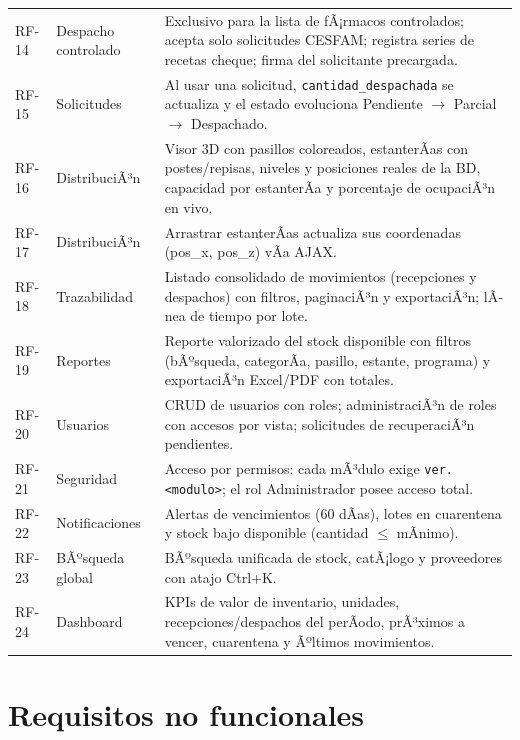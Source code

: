﻿\documentclass[a4paper, 12pt]{article}
\begin{document}
\begin{longtable}{@{}p{1.2cm} p{4.2cm} X@{}}
RF-14 & Despacho controlado & Exclusivo para la lista de fÃ¡rmacos controlados; acepta solo solicitudes CESFAM; registra series de recetas cheque; firma del solicitante precargada. \\
RF-15 & Solicitudes & Al usar una solicitud, \texttt{cantidad\_despachada} se actualiza y el estado evoluciona Pendiente $\to$ Parcial $\to$ Despachado. \\
RF-16 & DistribuciÃ³n & Visor 3D con pasillos coloreados, estanterÃ­as con postes/repisas, niveles y posiciones reales de la BD, capacidad por estanterÃ­a y porcentaje de ocupaciÃ³n en vivo. \\
RF-17 & DistribuciÃ³n & Arrastrar estanterÃ­as actualiza sus coordenadas (pos\_x, pos\_z) vÃ­a AJAX. \\
RF-18 & Trazabilidad & Listado consolidado de movimientos (recepciones y despachos) con filtros, paginaciÃ³n y exportaciÃ³n; lÃ­nea de tiempo por lote. \\
RF-19 & Reportes & Reporte valorizado del stock disponible con filtros (bÃºsqueda, categorÃ­a, pasillo, estante, programa) y exportaciÃ³n Excel/PDF con totales. \\
RF-20 & Usuarios & CRUD de usuarios con roles; administraciÃ³n de roles con accesos por vista; solicitudes de recuperaciÃ³n pendientes. \\
RF-21 & Seguridad & Acceso por permisos: cada mÃ³dulo exige \texttt{ver.<modulo>}; el rol Administrador posee acceso total. \\
RF-22 & Notificaciones & Alertas de vencimientos (60 dÃ­as), lotes en cuarentena y stock bajo disponible (cantidad $\le$ mÃ­nimo). \\
RF-23 & BÃºsqueda global & BÃºsqueda unificada de stock, catÃ¡logo y proveedores con atajo Ctrl+K. \\
RF-24 & Dashboard & KPIs de valor de inventario, unidades, recepciones/despachos del perÃ­odo, prÃ³ximos a vencer, cuarentena y Ãºltimos movimientos. \\
\bottomrule
\end{longtable}

\section{Requisitos no funcionales}
\end{document}
